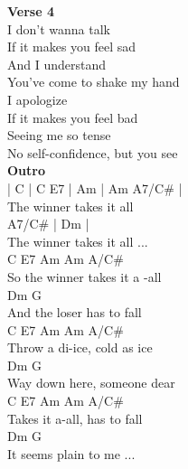 \documentclass[a4paper]{article}
\begin{document}
{\begin{multicols}
{            }
            \columnbreak
            \textbf{Verse 4}
            ~\\
            {
                \cutive
                \obeyspaces
I don't wanna talk
\\
If it makes you feel sad
\\
And I understand
\\
You've come to shake my hand
\\
I apologize
\\
If it makes you feel bad
\\
Seeing me so tense
\\
No self-confidence, but you see 
\\

            }
            \textbf{Outro}
            ~\\
            {
                \cutive
                \obeyspaces
                   | C | C E7 | Am | Am A7/C\# |
\\
The winner takes it all
\\
    A7/C\#         | Dm | %
\\
The winner takes it all ...
\\
C          E7 Am        Am A/C\#
\\
 So the winner takes it a -all
\\
Dm            G
\\
 And the loser has to fall
\\
C           E7  Am       Am A/C\#
\\
 Throw a di-ice, cold as ice
\\
Dm             G
\\
 Way down here, someone dear
\\
C           E7  Am      Am  A/C\#
\\
 Takes it a-all, has to fall
\\
Dm                     G
\\
 It seems plain to me ...\\

            }
        \end{multicols}
    }
\end{document}
